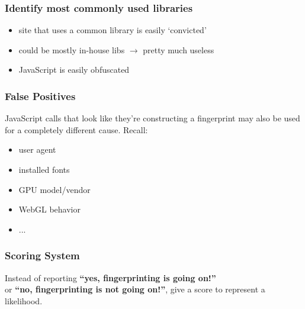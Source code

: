 \documentclass{beamer}
\begin{document}

\begin{frame}
    \frametitle{Identify most commonly used libraries}
    \begin{itemize}
        \item site that uses a common library is easily `convicted'
        \item could be mostly in-house libs $\rightarrow$ pretty much useless
        \item JavaScript is easily obfuscated
    \end{itemize}
    
\end{frame}


\begin{frame}
    \frametitle{False Positives}
    JavaScript calls that look like they're constructing a fingerprint may also be
    used for a completely different cause. Recall:
    \begin{itemize}
        \item user agent
        \item installed fonts
        \item GPU model/vendor
        \item WebGL behavior
        \item ...
    \end{itemize}
\end{frame}


\begin{frame}
    \frametitle{Scoring System}
    Instead of reporting \textbf{``yes, fingerprinting is going on!''} \\
    or \textbf{``no, fingerprinting is not going on!''}, give a score
    to represent a likelihood.
\end{frame}

\end{document}
